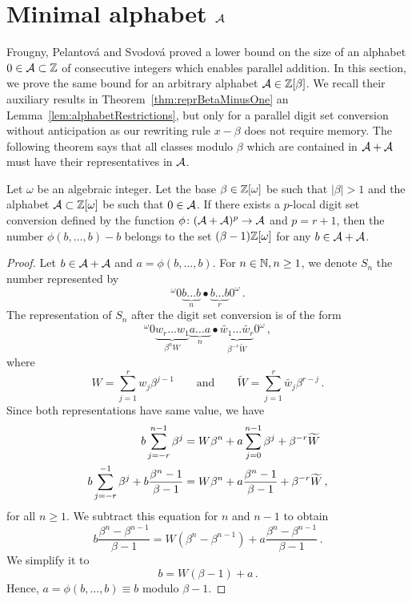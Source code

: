 \section{Minimal alphabet $\mathcal{A}$}
\label{sec:minimalAlphabet}	

Frougny, Pelantov\'a and Svodov\'a \cite{minAlph} proved a lower bound on the size of an alphabet $0\in\mathcal{A}\subset\mathbb{Z}$ of consecutive integers which enables parallel addition. In this section, we prove the same bound for an arbitrary alphabet $\mathcal{A}\in\mathbb{Z}[\beta]$. We recall their auxiliary results in Theorem~\ref{thm:reprBetaMinusOne} an Lemma~\ref{lem:alphabetRestrictions}, but only for a parallel digit set conversion without anticipation as our rewriting rule $x-\beta$ does not require memory. The following theorem says that all classes modulo $\beta$ which are contained in $\mathcal{A}+\mathcal{A}$ must have their representatives in $\mathcal{A}$.
\begin{thm}
\label{thm:reprBetaMinusOne}
Let $\omega$ be an algebraic integer. Let the base $\beta\in\mathbb{Z}[\omega]$ be such that $|\beta|>1$ and the alphabet $\mathcal{A}\subset\mathbb{Z}[\omega]$ be such that $0\in\mathcal{A}$. If there exists a $p$-local digit set conversion defined by the function $\phi\colon (\mathcal{A}+\mathcal{A})^p\rightarrow \mathcal{A}$ and $p=r+1$, then the number $\phi(b,\dots,b)-b$ belongs to the set $(\beta-1)\mathbb{Z}[\omega]$ for any $b\in\mathcal{A}+\mathcal{A}$. 
\end{thm}
\begin{proof}
Let $b\in\mathcal{A}+\mathcal{A}$ and $a=\phi(b, \dots,b)$. For $n\in\mathbb{N}, n\geq 1$, we denote $S_n$ the number represented by
$$
^{\omega}\!0 \underbrace{b\dots b}_{n}\bullet \underbrace{b\dots b}_{r}0^\omega\,.
$$
The representation of $S_n$ after the digit set conversion is of the form
$$
^{\omega}\!0 \underbrace{w_{r}\dots w_{1}}_{\beta^n W}\underbrace{a\dots a}_{n}\bullet \underbrace{\widetilde{w_1}\dots \widetilde{w_r}}_{\beta^{-r}\widetilde{W}}0^\omega\,,
$$
where 
$$W=\sum_{j=1}^r w_j \beta^{j-1} \qquad \text{and} \qquad \widetilde{W}=\sum_{j=1}^r\widetilde{w_j} \beta^{r-j}\,.$$
Since both representations have same value, we have
\begin{align}
\label{eq:reprBetaMinusOne}
b \sum_{j=-r}^{n-1} \beta^j &= W \beta^n + a \sum_{j=0}^{n-1} \beta^j + \beta^{-r}\widetilde{W} \notag \\
b \sum_{j=-r}^{-1} \beta^j +b\frac{\beta^n-1}{\beta-1} &= W \beta^n + a \frac{\beta^n-1}{\beta-1} + \beta^{-r}\widetilde{W}\,,
\end{align}
for all $n\geq 1$. We subtract this equation for $n$ and $n-1$ to obtain
$$
b\frac{\beta^n-\beta^{n-1}}{\beta-1}=W(\beta^n-\beta^{n-1}) + a\frac{\beta^n-\beta^{n-1}}{\beta-1}\,.
$$
We simplify it to
\begin{equation}
\label{eq:reprBetaMinusOneFinal}
b=W(\beta-1) + a\,.
\end{equation}
Hence, $a=\phi(b, \dots,b)\equiv b$ modulo $\beta-1$.
\end{proof}

